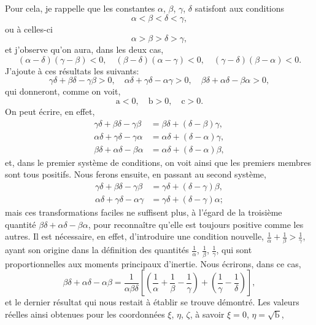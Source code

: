 \documentclass[11pt,leqno,oneside,letterpaper]{book}[2005/09/16]
\begin{document}
Pour cela, je rappelle que les constantes $\alpha$, $\beta$, $\gamma$, $\delta$ satisfont aux conditions
\[
\tag*{(I)}
\alpha < \beta < \delta < \gamma,
\]
ou \`a celles-ci
\[
\tag*{(II)}
\alpha > \beta > \delta > \gamma,
\]
et j'observe qu'on aura, dans les deux cas,
\[
(\alpha - \delta)(\gamma - \beta) < 0, \quad
(\beta  - \delta)(\alpha - \gamma) < 0, \quad
(\gamma - \delta)(\beta  - \alpha) < 0.
\]
J'ajoute \`a ces r\'esultats les suivants:
\[
\gamma\delta + \beta\delta - \gamma\beta > 0, \quad
\alpha\delta + \gamma\delta - \alpha\gamma > 0, \quad
\beta\delta  + \alpha\delta - \beta\alpha > 0,
\]
qui donneront, comme on voit,
\[
\mathrm{a} < 0, \quad
\mathrm{b} > 0, \quad
\mathrm{c} > 0.
\]
On peut \'ecrire, en effet,
\begin{align*}
\gamma\delta + \beta \delta - \gamma\beta  &= \beta \delta + (\delta - \beta )\gamma, \\
\alpha\delta + \gamma\delta - \gamma\alpha &= \alpha\delta + (\delta - \alpha)\gamma, \\
\beta \delta + \alpha\delta - \beta \alpha &= \alpha\delta + (\delta - \alpha)\beta,
\end{align*}
et, dans le premier syst\`eme de conditions, on voit ainsi que les premiers
mem\-bres sont tous positifs. Nous ferons ensuite, en passant au second
syst\`eme,
\begin{align*}
\gamma\delta + \beta \delta - \gamma\beta  &= \gamma\delta + (\delta - \gamma)\beta, \\
\alpha\delta + \gamma\delta - \alpha\gamma &= \gamma\delta + (\delta - \gamma)\alpha;
\end{align*}
mais ces transformations faciles ne suffisent plus, \`a l'\'egard de la troisi\`eme
quantit\'e $\beta\delta + \alpha\delta - \beta\alpha$, pour reconna\^itre qu'elle est toujours positive
comme les autres. Il est n\'ecessaire, en effet, d'introduire une condition
nouvelle, $\frac{1}{\alpha} + \frac{1}{\beta} > \frac{1}{\gamma}$, ayant son origine dans la d\'efinition des quantit\'es $\frac{1}{\alpha}$,
$\frac{1}{\beta}$, $\frac{1}{\gamma}$, qui sont proportionnelles aux moments principaux d'inertie. Nous
\'ecrirons, dans ce cas,
\[
\beta\delta + \alpha\delta - \alpha\beta = \frac{1}{\alpha\beta\delta}
\left[\left(\frac{1}{\alpha} + \frac{1}{\beta} - \frac{1}{\gamma}\right) +
      \left(\frac{1}{\gamma} - \frac{1}{\delta}\right)\right],
\]
et le dernier r\'esultat qui nous restait \`a \'etablir se trouve d\'emontr\'e. Les valeurs
r\'eelles ainsi obtenues pour les coordonn\'ees $\xi$, $\eta$, $\zeta$, \`a savoir $\xi = 0$, $\eta = \sqrt{\mathrm{b}}$,
\end{document}
